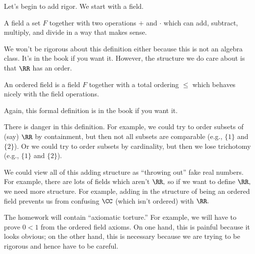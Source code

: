 Let's begin to add rigor. We start with a field.
\begin{defi}[Field]
    A field a set $F$ together with two operations $+$ and $\cdot$ which can add, subtract, multiply, and divide in a way that makes sense.
\end{defi}
We won't be rigorous about this definition either because this is not an algebra class. It's in the book if you want it. However, the structure we do care about is that $\RR$ has an order.
\begin{defi}
    An ordered field is a field $F$ together with a total ordering $\le$ which behaves nicely with the field operations.
\end{defi}
Again, this formal definition is in the book if you want it.
\begin{warn}
    There is danger in this definition. For example, we could try to order subsets of (say) $\RR$ by containment, but then not all subsets are comparable (e.g., $\{1\}$ and $\{2\}$). Or we could try to order subsets by cardinality, but then we lose trichotomy (e.g., $\{1\}$ and $\{2\}$).
\end{warn}
\begin{remark}
    We could view all of this adding structure as ``throwing out'' fake real numbers. For example, there are lots of fields which aren't $\RR,$ so if we want to define $\RR,$ we need more structure. For example, adding in the structure of being an ordered field prevents us from confusing $\CC$ (which isn't ordered) with $\RR.$
\end{remark}
\begin{remark}
    The homework will contain ``axiomatic torture.'' For example, we will have to prove $0<1$ from the ordered field axioms. On one hand, this is painful because it looks obvious; on the other hand, this is necessary because we are trying to be rigorous and hence have to be careful.
\end{remark}

